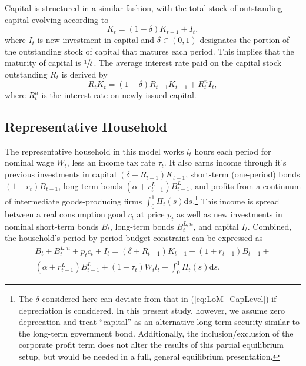 \documentclass[11pt,a4paper,margin=1.5in]{article}
\begin{document}
Capital is structured in a similar fashion, with the total stock of outstanding capital evolving according to
\begin{equation}
	K_t = (1-\delta)K_{t-1} + I_t,
	\label{eq:LoM_CapLevel}
\end{equation}
where $I_t$ is new investment in capital and $\delta \in (0,1)$ designates the portion of the outstanding stock of capital that matures each period.
This implies that the maturity of capital is $\sfrac{1}{\delta}$. 
The average interest rate paid on the capital stock outstanding $R_t$ is derived by
\begin{equation}
	R_tK_t = (1-\delta)R_{t-1}K_{t-1} + R^n_tI_t,
	\label{eq:LoM_CapReturn}
\end{equation}
where $R^n_t$ is the interest rate on newly-issued capital.

\subsection{Representative Household}
The representative household in this model works $l_t$ hours each period for nominal wage $W_t$, less an income tax rate $\tau_t$.
It also earns income through it's previous investments in capital $(\delta + R_{t-1})K_{t-1}$, short-term (one-period) bonds $(1+r_t)B_{t-1}$, long-term bonds $(\alpha + r^L_{t-1})B^L_{t-1}$, and profits from a continuum of intermediate goods-producing firms $\int^1_0 \Pi_t(s) \mathrm{d}s$.\footnote{
	The $\delta$ considered here can deviate from that in (\ref{eq:LoM_CapLevel}) if depreciation is considered.
	In this present study, however, we assume zero deprecation and treat ``capital'' as an alternative long-term security similar to the long-term government bond.
	Additionally, the inclusion/exclusion of the corporate profit term does not alter the results of this partial equilibrium setup, but would be needed in a full, general equilibrium presentation.}
This income is spread between a real consumption good $c_t$ at price $p_t$ as well as new investments in nominal short-term bonds $B_t$, long-term bonds $B^{L,n}_t$, and capital $I_t$.
Combined, the household's period-by-period budget constraint can be expressed as
\begin{multline}
	B_t + B^{L,n}_t + p_tc_t + I_t = (\delta + R_{t-1})K_{t-1} + (1+r_{t-1})B_{t-1} + \\ (\alpha + r^L_{t-1})B^L_{t-1} + (1-\tau_t)W_tl_t + \int^1_0\Pi_t(s)\text{d}s.
	\label{eq:HH_Budget}
\end{multline}
\end{document}
